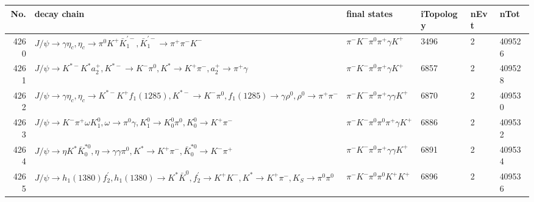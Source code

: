 \begin{table}[htbp] 
\begin{center}
\begin{small}
\begin{tabular}{rlllll}\hline\hline
 No. & decay chain & final states &  iTopology & nEvt & nTot \\\hline
4260&$J/\psi       \rightarrow \gamma       \eta_{c}    , \eta_{c}     \rightarrow \pi^{0}        K^{+}          \bar{K}_1^{'-}, \bar{K}_1^{'-} \rightarrow \pi^{+}        \pi^{-}        K^{-}          $&$\pi^{-}        K^{-}          \pi^{0}        \pi^{+}        \gamma       K^{+}          $& 3496&    2&409526\\
4261&$J/\psi       \rightarrow K^{*-}         K^{*}          a_{2}^{+}      , K^{*-}          \rightarrow K^{-}          \pi^{0}        , K^{*}           \rightarrow K^{+}          \pi^{-}        , a_{2}^{+}       \rightarrow \pi^{+}        \gamma       $&$\pi^{-}        K^{-}          \pi^{0}        \pi^{+}        \gamma       K^{+}          $& 6857&    2&409528\\
4262&$J/\psi       \rightarrow \gamma       \eta_{c}    , \eta_{c}     \rightarrow K^{*-}         K^{+}          f_{1}(1285)    , K^{*-}          \rightarrow K^{-}          \pi^{0}        , f_{1}(1285)     \rightarrow \gamma       \rho^{0}      , \rho^{0}       \rightarrow \pi^{+}        \pi^{-}        $&$\pi^{-}        K^{-}          \pi^{0}        \pi^{+}        \gamma       \gamma       K^{+}          $& 6870&    2&409530\\
4263&$J/\psi       \rightarrow K^{-}          \pi^{+}        \omega         K_1^{0}        , \omega          \rightarrow \pi^{0}        \gamma       , K_1^{0}         \rightarrow K_0^{0}        \pi^{0}        , K_0^{0}         \rightarrow K^{+}          \pi^{-}        $&$\pi^{-}        K^{-}          \pi^{0}        \pi^{0}        \pi^{+}        \gamma       K^{+}          $& 6886&    2&409532\\
4264&$J/\psi       \rightarrow \eta          K^{*}          \bar{K}_0^{*0}, \eta           \rightarrow \gamma       \gamma       \pi^{0}        , K^{*}           \rightarrow K^{+}          \pi^{-}        , \bar{K}_0^{*0} \rightarrow K^{-}          \pi^{+}        $&$\pi^{-}        K^{-}          \pi^{0}        \pi^{+}        \gamma       \gamma       K^{+}          $& 6891&    2&409534\\
4265&$J/\psi       \rightarrow h_{1}(1380)    f_2^{'}       , h_{1}(1380)     \rightarrow K^{*}          \bar{K}^{0}   , f_2^{'}        \rightarrow K^{+}          K^{-}          , K^{*}           \rightarrow K^{+}          \pi^{-}        , K_{S}           \rightarrow \pi^{0}        \pi^{0}        $&$\pi^{-}        K^{-}          \pi^{0}        \pi^{0}        K^{+}          K^{+}          $& 6896&    2&409536\\

\end{tabular}
\end{small}
\end{center}
\end{table}
